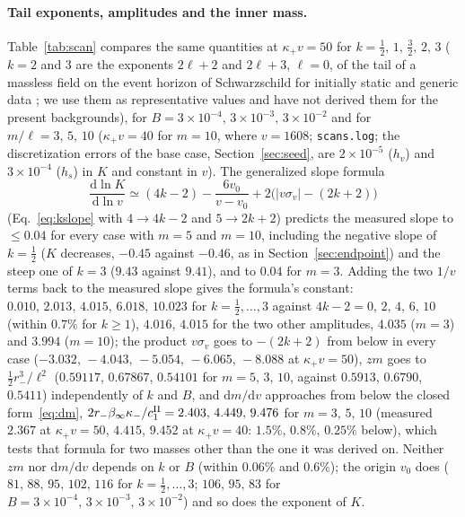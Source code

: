 \documentclass[11pt]{article}
\begin{document}
\paragraph{Tail exponents, amplitudes and the inner mass.} Table~\ref{tab:scan} compares the same quantities at $\kappa_+v=50$ for $k=\tfrac12,\,1,\,\tfrac32,\,2,\,3$ ($k=2$ and $3$ are the exponents $2\ell+2$ and $2\ell+3$, $\ell=0$, of the tail of a massless field on the event horizon of Schwarzschild for initially static and generic data \citep{GundlachPricePullin1994}; we use them as representative values and have not derived them for the present backgrounds), for $B=3\times10^{-4},\,3\times10^{-3},\,3\times10^{-2}$ and for $m/\ell=3,\,5,\,10$ ($\kappa_+v=40$ for $m=10$, where $v=1608$; \texttt{scans.log}; the discretization errors of the base case, Section~\ref{sec:seed}, are $2\times10^{-5}$ ($h_v$) and $3\times10^{-4}$ ($h_s$) in $K$ and constant in $v$). The generalized slope formula
\begin{equation}
\frac{\mathrm d\ln K}{\mathrm d\ln v}\simeq(4k-2)-\frac{6v_0}{v-v_0}+2\bigl(|v\sigma_v|-(2k+2)\bigr)
\label{eq:kslopek}
\end{equation}
(Eq.~\eqref{eq:kslope} with $4\to4k-2$ and $5\to2k+2$) predicts the measured slope to $\le0.04$ for every case with $m=5$ and $m=10$, including the negative slope of $k=\tfrac12$ ($K$ decreases, $-0.45$ against $-0.46$, as in Section~\ref{sec:endpoint}) and the steep one of $k=3$ ($9.43$ against $9.41$), and to $0.04$ for $m=3$. Adding the two $1/v$ terms back to the measured slope gives the formula's constant: $0.010,\,2.013,\,4.015,\,6.018,\,10.023$ for $k=\tfrac12,\ldots,3$ against $4k-2=0,\,2,\,4,\,6,\,10$ (within $0.7\%$ for $k\ge1$), $4.016$, $4.015$ for the two other amplitudes, $4.035$ ($m=3$) and $3.994$ ($m=10$); the product $v\sigma_v$ goes to $-(2k+2)$ from below in every case ($-3.032,\,-4.043,\,-5.054,\,-6.065,\,-8.088$ at $\kappa_+v=50$), $zm$ goes to $\tfrac12r_-^{3}/\ell^{2}$ ($0.59117$, $0.67867$, $0.54101$ for $m=5,\,3,\,10$, against $0.5913$, $0.6790$, $0.5411$) independently of $k$ and $B$, and $\mathrm dm/\mathrm dv$ approaches from below the closed form~\eqref{eq:dm}, $2r_-\beta_\infty\kappa_-/c_1^{\rm II}=2.403,\,4.449,\,9.476$ for $m=3,\,5,\,10$ (measured $2.367$ at $\kappa_+v=50$, $4.415$, $9.452$ at $\kappa_+v=40$: $1.5\%$, $0.8\%$, $0.25\%$ below), which tests that formula for two masses other than the one it was derived on. Neither $zm$ nor $\mathrm dm/\mathrm dv$ depends on $k$ or $B$ (within $0.06\%$ and $0.6\%$); the origin $v_0$ does ($81,\,88,\,95,\,102,\,116$ for $k=\tfrac12,\ldots,3$; $106,\,95,\,83$ for $B=3\times10^{-4},\,3\times10^{-3},\,3\times10^{-2}$) and so does the exponent of $K$.
\end{document}
